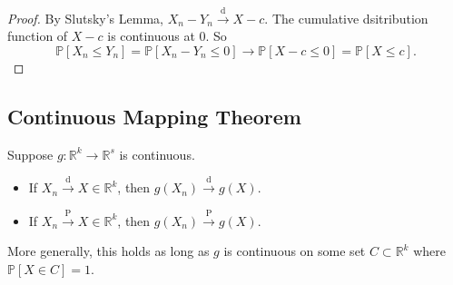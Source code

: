 \documentclass[a4paper]{article}
\begin{document}
\begin{proof}
	By Slutsky's Lemma, $X_n - Y_n \stackrel{\text{d}}{\longrightarrow} X-c$. The cumulative dsitribution function of $X-c$ is continuous at $0$. So
	\begin{equation}
		\mathbb{P}[X_n \leq Y_n] = \mathbb{P}[X_n - Y_n \leq 0] \to \mathbb{P}[X - c \leq 0] = \mathbb{P}[X \leq c].
	\end{equation}
\end{proof}

\subsection{Continuous Mapping Theorem}

\begin{thm}
	Suppose $g: \mathbb{R}^k \to \mathbb{R}^s$ is continuous.
	\begin{itemize}
		\item If $X_n \stackrel{\text{d}}{\longrightarrow} X \in \mathbb{R}^k$, then $g(X_n) \stackrel{\text{d}}{\longrightarrow} g(X)$.
		\item If $X_n \stackrel{\text{P}}{\longrightarrow} X \in \mathbb{R}^k$, then $g(X_n) \stackrel{\text{P}}{\longrightarrow} g(X)$.
	\end{itemize}
	More generally, this holds as long as $g$ is continuous on some set $C \subset \mathbb{R}^k$ where $\mathbb{P}[X \in C] = 1$.
\end{thm}
\end{document}
